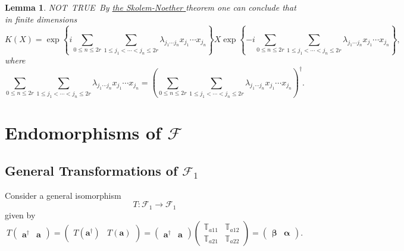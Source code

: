 \documentclass[aps, preprint]{revtex4}
\newtheorem{lemma}[theorem]{Lemma}
\begin{document}
\begin{lemma}
NOT\ TRUE\ By \underline {the \emph{Skolem-Noether
}} theorem one can conclude that in finite dimensions
\begin{equation}K \left (X\right ) =\exp  \left \{i  \sum _{0 \leq n \leq 2 r} \sum _{1 \leq j_{1} <\cdots  <j_{n} \leq 2 r}\lambda _{j_{1} \cdots  j_{n}} x_{j_{1}} \cdots  x_{j_{n}}\right \} X \exp  \left \{ -i  \sum _{0 \leq n \leq 2 r} \sum _{1 \leq j_{1} <\cdots  <j_{n} \leq 2 r}\lambda _{j_{1} \cdots  j_{n}} x_{j_{1}} \cdots  x_{j_{n}}\right \}\text{,}
\end{equation}where
\begin{equation} \sum _{0 \leq n \leq 2 r} \sum _{1 \leq j_{1} <\cdots  <j_{n} \leq 2 r}\lambda _{j_{1} \cdots  j_{n}} x_{j_{1}} \cdots  x_{j_{n}} =\left ( \sum _{0 \leq n \leq 2 r} \sum _{1 \leq j_{1} <\cdots  <j_{n} \leq 2 r}\lambda _{j_{1} \cdots  j_{n}} x_{j_{1}} \cdots  x_{j_{n}}\right )^{ \dag }\text{.}
\end{equation}
\end{lemma}

\section{Endomorphisms of $\mathcal{F}$}


\subsection{General Transformations of $\mathcal{F}_{1}$}
Consider a general isomorphism
\begin{equation}T :\mathcal{F}_{1} \rightarrow \mathcal{F}_{1}
\end{equation}given by
\begin{equation}T \left (\begin{array}{cc}\mathbf{a}^{ \dag } & \mathbf{a}\end{array}\right ) =\left (\begin{array}{cc}T \left (\mathbf{a}^{ \dag }\right ) & T \left (\mathbf{a}\right )\end{array}\right ) =\left (\begin{array}{cc}\mathbf{a}^{ \dag } & \mathbf{a}\end{array}\right ) \left (\begin{array}{cc}\mathbb{T}_{a 1 1} & \mathbb{T}_{a 1 2} \\
\mathbb{T}_{a 2 1} & \mathbb{T}_{a 2 2}\end{array}\right ) =\left (\begin{array}{cc}\mathbf{\beta } & \mathbf{\alpha }\end{array}\right )\text{.}
\end{equation}
\end{document}
